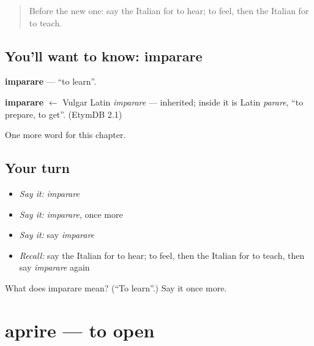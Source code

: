 \label{lesson:IT-C49-imparare}



\begin{quote}
Before the new one: say the Italian for to hear; to feel, then the Italian for to teach.
\end{quote}

\subsection*{You'll want to know: imparare}
\textbf{imparare} — \textquotedblleft{}to learn\textquotedblright{}.

\begin{cousinweb}
\textbf{imparare} $\leftarrow$ Vulgar Latin \emph{imparare} — inherited; inside it is Latin \emph{parare}, \textquotedblleft{}to prepare, to get\textquotedblright{}. (EtymDB 2.1)
\end{cousinweb}

\begin{grammarlens}[title={What you've built}]
One more word for this chapter.
\end{grammarlens}

\subsection*{Your turn}
\begin{itemize}
\raggedright
  \item \emph{Say it:} \emph{imparare}
  \item \emph{Say it:} \emph{imparare}, once more
  \item \emph{Say it:} say \emph{imparare}
  \item \emph{Recall:} say the Italian for to hear; to feel, then the Italian for to teach, then say \emph{imparare} again
\end{itemize}

\begin{tcolorbox}[breakable,colback=teal!4,colframe=teal!35!black,title={Before you move on}]
What does imparare mean? (\textquotedblleft{}To learn\textquotedblright{}.) Say it once more.
\end{tcolorbox}
\section[aprire]{aprire — to open}

\label{lesson:IT-C49-aprire}



